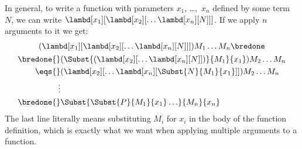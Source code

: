 \documentclass[../../../include/open-logic-section]{subfiles}
\begin{document}
In general, to write a function with parameters $x_1$, \dots,~$x_n$
defined by some term~$N$, we can write
$\lambd[x_1][\lambd[x_2][\ldots\lambd[x_n][N]]]$. If we apply $n$ arguments
to it we get:
\begin{multline*}
  (\lambd[x_1][\lambd[x_2][\ldots\lambd[x_n][N]]]) M_1 \dots M_n \bredone\\
  \begin{aligned}
  \bredone {} & (\Subst{(\lambd[x_2][\ldots\lambd[x_n][N]])}{M_1}{x_1}) M_2
  \dots M_n\\
   \eqs {} & (\lambd[x_2][\ldots\lambd[x_n][\Subst{N}{M_1}{x_1}]]) M_2
            \dots M_n \\
  \vdots & \\
  \bredone {} &\Subst{\Subst{P}{M_1}{x_1}\ldots}{M_n}{x_n}
  \end{aligned}
\end{multline*}
The last line literally means substituting $M_i$ for $x_i$ in the body
of the function definition, which is exactly what we want when
applying multiple arguments to a function.
\end{document}
